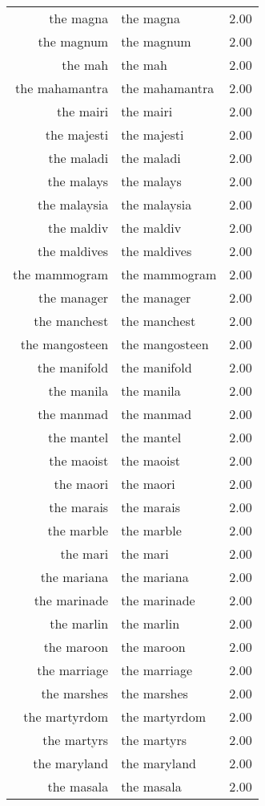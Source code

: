 \begin{table}[ht]
\begin{tabular}{rlr}
  the magna & the magna & 2.00 \\ 
  the magnum & the magnum & 2.00 \\ 
  the mah & the mah & 2.00 \\ 
  the mahamantra & the mahamantra & 2.00 \\ 
  the mairi & the mairi & 2.00 \\ 
  the majesti & the majesti & 2.00 \\ 
  the maladi & the maladi & 2.00 \\ 
  the malays & the malays & 2.00 \\ 
  the malaysia & the malaysia & 2.00 \\ 
  the maldiv & the maldiv & 2.00 \\ 
  the maldives & the maldives & 2.00 \\ 
  the mammogram & the mammogram & 2.00 \\ 
  the manager & the manager & 2.00 \\ 
  the manchest & the manchest & 2.00 \\ 
  the mangosteen & the mangosteen & 2.00 \\ 
  the manifold & the manifold & 2.00 \\ 
  the manila & the manila & 2.00 \\ 
  the manmad & the manmad & 2.00 \\ 
  the mantel & the mantel & 2.00 \\ 
  the maoist & the maoist & 2.00 \\ 
  the maori & the maori & 2.00 \\ 
  the marais & the marais & 2.00 \\ 
  the marble & the marble & 2.00 \\ 
  the mari & the mari & 2.00 \\ 
  the mariana & the mariana & 2.00 \\ 
  the marinade & the marinade & 2.00 \\ 
  the marlin & the marlin & 2.00 \\ 
  the maroon & the maroon & 2.00 \\ 
  the marriage & the marriage & 2.00 \\ 
  the marshes & the marshes & 2.00 \\ 
  the martyrdom & the martyrdom & 2.00 \\ 
  the martyrs & the martyrs & 2.00 \\ 
  the maryland & the maryland & 2.00 \\ 
  the masala & the masala & 2.00 \\ 

\end{tabular}
\end{table}
